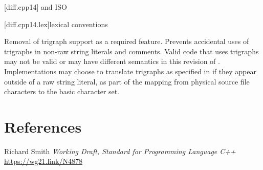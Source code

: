 \documentclass{wg21}
\begin{document}
[diff.cpp14]{\Cpp{} and ISO \CppXIV{}}


[diff.cpp14.lex]{lexical conventions}


%
\change
Removal of trigraph support as a required feature.
\rationale
Prevents accidental uses of trigraphs in non-raw string literals and comments.
\effect
Valid \CppXIV{} code that uses trigraphs may not be valid or may have different
semantics in this revision of \Cpp{}. Implementations may choose to
translate trigraphs as specified in \CppXIV{} if they appear outside of a raw
string literal, as part of the  mapping from physical source file characters to
the basic  character set.

\section{References}
\renewcommand{\section}[2]{}%



\begin{thebibliography}{9}

Richard Smith
\emph{Working Draft, Standard for Programming Language C++}\newline
\url{https://wg21.link/N4878}

\end{thebibliography}
\end{document}
